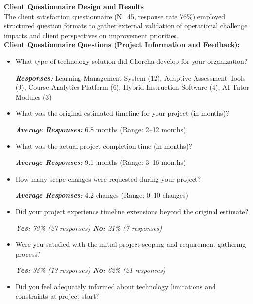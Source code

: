 \documentclass[12pt,a4paper,oneside]{book}
\begin{document}
\textbf{Client Questionnaire Design and Results}\\

The client satisfaction questionnaire (N=45, response rate 76\%) employed structured question formats to gather external validation of operational challenge impacts and client perspectives on improvement priorities.\\


\textbf{Client Questionnaire Questions (Project Information and Feedback):}
\begin{itemize}
  \item What type of technology solution did Chorcha develop for your organization?
  
  \textbf{\textit{Responses:}} Learning Management System (12), Adaptive Assessment Tools (9), Course Analytics Platform (6), Hybrid Instruction Software (4), AI Tutor Modules (3)\\

  \item What was the original estimated timeline for your project (in months)?
  
  \textbf{\textit{Average Responses:}} 6.8 months (Range: 2–12 months)\\

  \item What was the actual project completion time (in months)?
  
  \textbf{\textit{Average Responses:}} 9.1 months (Range: 3–16 months)\\

  \item How many scope changes were requested during your project?
  
  \textbf{\textit{Average Responses:}} 4.2 changes (Range: 0–10 changes)\\

  \item Did your project experience timeline extensions beyond the original estimate?
  
  \textit{\textbf{Yes:} 79\% (27 responses) \quad \textbf{No:} 21\% (7 responses)}\\

  \item Were you satisfied with the initial project scoping and requirement gathering process?
  
  \textit{\textbf{Yes:} 38\% (13 responses) \quad \textbf{No:} 62\% (21 responses)}\\

  \item Did you feel adequately informed about technology limitations and constraints at project start?
  

\end{itemize}
\end{document}
